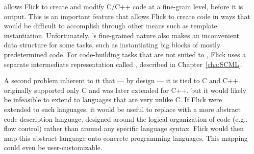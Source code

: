 \CAST{} allows Flick to create and modify C/C++ code at a fine-grain level,
before it is output.  This is an important feature that allows Flick to create
code in ways that would be difficult to accomplish through other means such as
template instantiation.  Unfortunately, \CAST{}'s fine-grained nature also makes
\CAST{} an inconvenient data structure for some tasks, such as instantiating
big blocks of mostly predetermined code.  For code-building tasks that are not
suited to \CAST{}, Flick uses a separate intermediate representation called
\SCML{}, described in Chapter~\ref{cha:SCML}.

A second problem inherent to \CAST{} it that --- by design --- it is tied to C
and C++.  \CAST{} originally supported only C and was later extended for C++,
but it would likely be infeasible to extend \CAST{} to languages that are very
unlike C\@.  If Flick were extended to such languages, it would be useful to
replace \CAST{} with a more abstract code description language, designed around
the logical organization of code (e.g., flow control) rather than around any
specific language syntax.  Flick would then map this abstract language onto
concrete programming languages.  This mapping could even be user-customizable.



